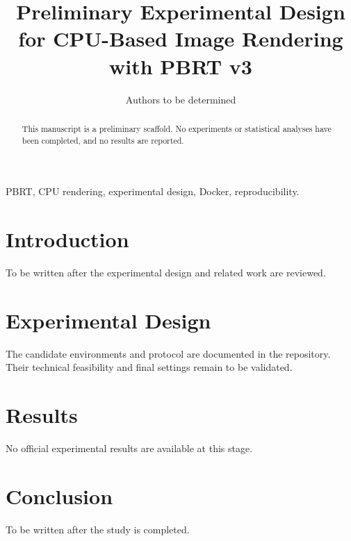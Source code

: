 \documentclass[journal]{IEEEtran}
\title{Preliminary Experimental Design for CPU-Based Image Rendering with PBRT v3}
\author{Authors to be determined}
\begin{document}
\maketitle

\begin{abstract}
This manuscript is a preliminary scaffold. No experiments or statistical
analyses have been completed, and no results are reported.
\end{abstract}

\begin{IEEEkeywords}
PBRT, CPU rendering, experimental design, Docker, reproducibility.
\end{IEEEkeywords}

\section{Introduction}
To be written after the experimental design and related work are reviewed.

\section{Experimental Design}
The candidate environments and protocol are documented in the repository.
Their technical feasibility and final settings remain to be validated.

\section{Results}
No official experimental results are available at this stage.

\section{Conclusion}
To be written after the study is completed.



\end{document}

